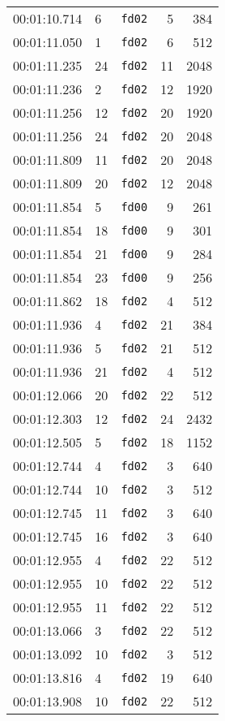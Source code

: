 \documentclass{article}
\begin{document}
\begin{longtable}{lllrr}
00:01:10.714 & 6 & \texttt{fd02} & 5 & 384 \\
00:01:11.050 & 1 & \texttt{fd02} & 6 & 512 \\
00:01:11.235 & 24 & \texttt{fd02} & 11 & 2048 \\
00:01:11.236 & 2 & \texttt{fd02} & 12 & 1920 \\
00:01:11.256 & 12 & \texttt{fd02} & 20 & 1920 \\
00:01:11.256 & 24 & \texttt{fd02} & 20 & 2048 \\
00:01:11.809 & 11 & \texttt{fd02} & 20 & 2048 \\
00:01:11.809 & 20 & \texttt{fd02} & 12 & 2048 \\
00:01:11.854 & 5 & \texttt{fd00} & 9 & 261 \\
00:01:11.854 & 18 & \texttt{fd00} & 9 & 301 \\
00:01:11.854 & 21 & \texttt{fd00} & 9 & 284 \\
00:01:11.854 & 23 & \texttt{fd00} & 9 & 256 \\
00:01:11.862 & 18 & \texttt{fd02} & 4 & 512 \\
00:01:11.936 & 4 & \texttt{fd02} & 21 & 384 \\
00:01:11.936 & 5 & \texttt{fd02} & 21 & 512 \\
00:01:11.936 & 21 & \texttt{fd02} & 4 & 512 \\
00:01:12.066 & 20 & \texttt{fd02} & 22 & 512 \\
00:01:12.303 & 12 & \texttt{fd02} & 24 & 2432 \\
00:01:12.505 & 5 & \texttt{fd02} & 18 & 1152 \\
00:01:12.744 & 4 & \texttt{fd02} & 3 & 640 \\
00:01:12.744 & 10 & \texttt{fd02} & 3 & 512 \\
00:01:12.745 & 11 & \texttt{fd02} & 3 & 640 \\
00:01:12.745 & 16 & \texttt{fd02} & 3 & 640 \\
00:01:12.955 & 4 & \texttt{fd02} & 22 & 512 \\
00:01:12.955 & 10 & \texttt{fd02} & 22 & 512 \\
00:01:12.955 & 11 & \texttt{fd02} & 22 & 512 \\
00:01:13.066 & 3 & \texttt{fd02} & 22 & 512 \\
00:01:13.092 & 10 & \texttt{fd02} & 3 & 512 \\
00:01:13.816 & 4 & \texttt{fd02} & 19 & 640 \\
00:01:13.908 & 10 & \texttt{fd02} & 22 & 512 \\

\end{longtable}
\end{document}
